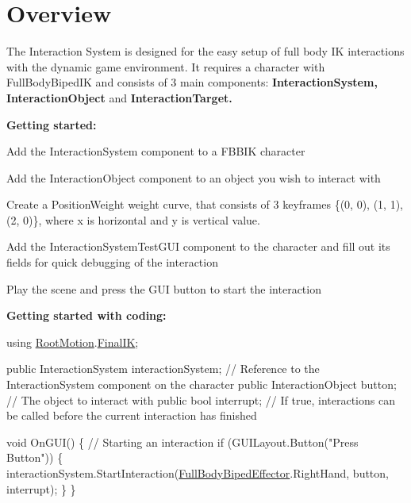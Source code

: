 \hypertarget{page10_overview}{}\section{Overview}\label{page10_overview}
The Interaction System is designed for the easy setup of full body IK interactions with the dynamic game environment. It requires a character with Full\+Body\+Biped\+IK and consists of 3 main components\+: {\bfseries Interaction\+System, Interaction\+Object} and {\bfseries Interaction\+Target.}

{\bfseries Getting started\+:}
\begin{DoxyItemize}
\item Add the Interaction\+System component to a F\+B\+B\+IK character
\item Add the Interaction\+Object component to an object you wish to interact with
\item Create a Position\+Weight weight curve, that consists of 3 keyframes \{(0, 0), (1, 1), (2, 0)\}, where x is horizontal and y is vertical value.
\item Add the Interaction\+System\+Test\+G\+UI component to the character and fill out its fields for quick debugging of the interaction
\item Play the scene and press the G\+UI button to start the interaction
\end{DoxyItemize}

{\bfseries Getting started with coding\+:} ~\newline



\begin{DoxyCode}
\textcolor{keyword}{using} \mbox{\hyperlink{namespace_root_motion}{RootMotion}}.\mbox{\hyperlink{namespace_root_motion_1_1_final_i_k}{FinalIK}};

\textcolor{keyword}{public} InteractionSystem interactionSystem; \textcolor{comment}{// Reference to the InteractionSystem component on the
       character}
\textcolor{keyword}{public} InteractionObject button; \textcolor{comment}{// The object to interact with}
\textcolor{keyword}{public} \textcolor{keywordtype}{bool} interrupt; \textcolor{comment}{// If true, interactions can be called before the current interaction has finished}

\textcolor{keywordtype}{void} OnGUI() \{
    \textcolor{comment}{// Starting an interaction}
    \textcolor{keywordflow}{if} (GUILayout.Button(\textcolor{stringliteral}{"Press Button"})) \{
        interactionSystem.StartInteraction(\mbox{\hyperlink{namespace_root_motion_1_1_final_i_k_ae0dd2058c7667b6f132c11a6b860c14a}{FullBodyBipedEffector}}.RightHand, button, 
      interrupt);
    \}
\}
\end{DoxyCode}


